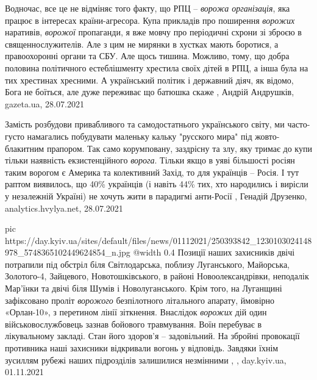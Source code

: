 Водночас, все це не відміняє того факту, що РПЦ – \emph{ворожа організація}, яка
працює в інтересах країни-агресора. Купа прикладів про поширення \emph{ворожих}
наративів, \emph{ворожої} пропаганди, я вже мовчу про періодичні схрони зі зброєю в
священнослужителів. Але з цим не мирянки в хустках мають боротися, а
правоохоронні органи та СБУ. Але щось тишина. Можливо, тому, що добра половина
політичного естеблішменту хрестила своїх дітей в РПЦ, а інша була на тих
хрестинах хресними. А український політик і державний діяч, як відомо, Бога не
боїться, але дуже переживає що батюшка скаже
, 
Андрій Андрушків, gazeta.ua, 28.07.2021

Замість розбудови привабливого та самодостатнього українського світу, ми
часто-густо намагались побудувати маленьку кальку "русского мира" під
жовто-блакитним прапором. Так само корумповану, заздрісну та злу, яку тримає до
купи тільки наявність екзистенційного \emph{ворога}. Тільки якщо в уяві більшості
росіян таким ворогом є Америка та колективний Захід, то для українців – Росія.
І тут раптом виявилось, що 40\% українців (і навіть 44\% тих, хто народились і
вирісли у незалежній Україні) не хочуть жити в парадигмі анти-Росії
, 
Генадій Друзенко, analytics.hvylya.net, 28.07.2021

\ifcmt
  pic https://day.kyiv.ua/sites/default/files/news/01112021/250393842_1230103024148978_5748365102449624854_n.jpg
  @width 0.4
\fi
Позиції наших захисників двічі потрапили під обстріл біля Світлодарська,
поблизу Луганського, Майорська, Золотого-4, Зайцевого, Новотошківського, в
районі Новоолександрівки, неподалік Мар'їнки та двічі біля Шумів і
Новолуганського.  Крім того, на Луганщині зафіксовано проліт \emph{ворожого}
безпілотного літального апарату, ймовірно «Орлан-10», з перетином лінії
зіткнення.  Внаслідок \emph{ворожих} дій один військовослужбовець зазнав
бойового травмування.  Воїн перебуває в лікувальному закладі. Стан його
здоров’я – задовільний.  На збройні провокації противника наші захисники
відкривали вогонь у відповідь.  Завдяки їхнім зусиллям рубежі наших підрозділів
залишилися незмінними
, , day.kyiv.ua, 01.11.2021

